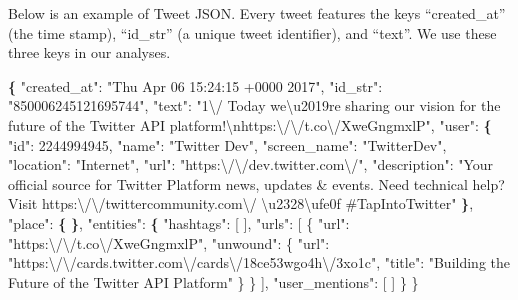 \documentclass[
]{article}
\newenvironment{Shaded}{\begin{snugshade}}{\end{snugshade}}
\newcommand{\BuiltInTok}[1]{#1}
\newcommand{\ExtensionTok}[1]{#1}
\newcommand{\KeywordTok}[1]{\textcolor[rgb]{0.13,0.29,0.53}{\textbf{#1}}}
\newcommand{\NormalTok}[1]{#1}
\newcommand{\StringTok}[1]{\textcolor[rgb]{0.31,0.60,0.02}{#1}}
\begin{document}
Below is an example of Tweet JSON. Every tweet features the keys
``created\_at'' (the time stamp), ``id\_str'' (a unique tweet
identifier), and ``text''. We use these three keys in our analyses.

\begin{Shaded}
\begin{Highlighting}[]
\KeywordTok{\{}
  \StringTok{"created_at"}\NormalTok{: }\StringTok{"Thu Apr 06 15:24:15 +0000 2017"}\NormalTok{,}
  \StringTok{"id_str"}\NormalTok{: }\StringTok{"850006245121695744"}\NormalTok{,}
  \StringTok{"text"}\NormalTok{: }\StringTok{"1\textbackslash{}/ Today we\textbackslash{}u2019re sharing our vision for the future of the Twitter API platform!\textbackslash{}nhttps:\textbackslash{}/\textbackslash{}/t.co\textbackslash{}/XweGngmxlP"}\NormalTok{,}
  \StringTok{"user"}\NormalTok{: }\KeywordTok{\{}
    \StringTok{"id"}\NormalTok{: }\ExtensionTok{2244994945}\NormalTok{,}
    \StringTok{"name"}\NormalTok{: }\StringTok{"Twitter Dev"}\NormalTok{,}
    \StringTok{"screen_name"}\NormalTok{: }\StringTok{"TwitterDev"}\NormalTok{,}
    \StringTok{"location"}\NormalTok{: }\StringTok{"Internet"}\NormalTok{,}
    \StringTok{"url"}\NormalTok{: }\StringTok{"https:\textbackslash{}/\textbackslash{}/dev.twitter.com\textbackslash{}/"}\NormalTok{,}
    \StringTok{"description"}\NormalTok{: }\StringTok{"Your official source for Twitter Platform news, updates & events. }
\StringTok{    Need technical help? Visit https:\textbackslash{}/\textbackslash{}/twittercommunity.com\textbackslash{}/ \textbackslash{}u2328\textbackslash{}ufe0f }
\StringTok{    #TapIntoTwitter"}
  \KeywordTok{\}}\NormalTok{,}
  \StringTok{"place"}\NormalTok{: }\KeywordTok{\{}   
  \KeywordTok{\}}\NormalTok{,}
  \StringTok{"entities"}\NormalTok{: }\KeywordTok{\{}
    \StringTok{"hashtags"}\NormalTok{:}\BuiltInTok{ [}      
\NormalTok{    ],}
    \StringTok{"urls"}\NormalTok{: [}
\NormalTok{      \{}
        \StringTok{"url"}\NormalTok{: }\StringTok{"https:\textbackslash{}/\textbackslash{}/t.co\textbackslash{}/XweGngmxlP"}\NormalTok{,}
        \StringTok{"unwound"}\NormalTok{: \{}
          \StringTok{"url"}\NormalTok{: }\StringTok{"https:\textbackslash{}/\textbackslash{}/cards.twitter.com\textbackslash{}/cards\textbackslash{}/18ce53wgo4h\textbackslash{}/3xo1c"}\NormalTok{,}
          \StringTok{"title"}\NormalTok{: }\StringTok{"Building the Future of the Twitter API Platform"}
\NormalTok{        \}}
\NormalTok{      \}}
\NormalTok{    ],}
    \StringTok{"user_mentions"}\NormalTok{: [     }
\NormalTok{    ]}
\NormalTok{  \}}
\NormalTok{\}}
\end{Highlighting}
\end{Shaded}
\end{document}
